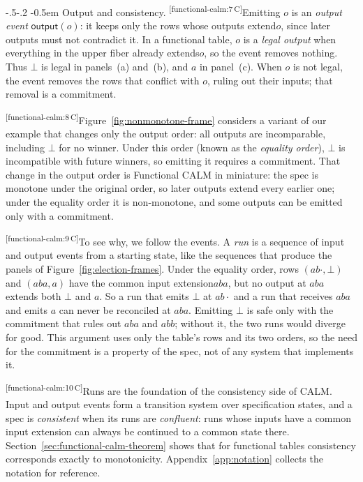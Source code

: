 \documentclass[sigconf]{cidr-2027}
\makeatletter
\theoremstyle{remark}
\renewcommand\paragraph{\@startsection{paragraph}{4}{\z@}%
  {-.5\baselineskip \@plus -2\p@ \@minus -.2\p@}%
  {-0.5em}%
  {\normalfont\bfseries}}
\newcommand{\commitment}{commitment\xspace}
\newcommand{\indesc}{input extension\xspace} %
\newcommand{\outrel}{extends\xspace}          %
\newcommand{\outrelbase}{extend\xspace}       %
\newcommand{\cxtag}[2]{\textsuperscript{\textsf{\tiny[#1\,#2]}}}
\makeatother
\begin{document}
\paragraph{Output and consistency.}
\color{black!45}\cxtag{functional-calm:7}{C}Emitting $o$ is an \emph{output event} $\mathsf{output}(o)$: it keeps only the
rows whose outputs \outrelbase $o$, since later outputs must not contradict it.
In a functional table, $o$ is a \emph{legal output} when everything in the
upper fiber already \outrel $o$, so the event removes nothing.  Thus
$\bot$ is legal in panels~(a) and~(b), and $a$ in panel~(c).  When $o$ is not
legal, the event removes the rows that conflict with $o$, ruling out their
inputs; that removal is a \commitment.\color{black}

\color{black!45}\cxtag{functional-calm:8}{C}Figure~\ref{fig:nonmonotone-frame} considers a variant of our example that
changes only the output order: all outputs are incomparable, including $\bot$
for no winner. Under this order (known as the \emph{equality order}), $\bot$ is
incompatible with future winners, so emitting it requires a \commitment.  That
change in the output order is Functional CALM in miniature: the spec is monotone
under the original order, so later outputs \outrelbase every earlier one; under
the equality order it is non-monotone, and some outputs can be emitted only with a \commitment.\color{black}

\color{black!45}\cxtag{functional-calm:9}{C}To see why, we follow the events.  A \emph{run} is a sequence of input and output
events from a starting state, like the sequences that produce the panels of
Figure~\ref{fig:election-frames}.  Under the equality order, rows
$(ab\cdot,\bot)$ and $(aba,a)$ have the common \indesc $aba$, but no output at
$aba$ \outrel both $\bot$ and $a$.  So a run that emits $\bot$ at $ab\cdot$ and
a run that receives $aba$ and emits $a$ can never be reconciled at $aba$.
Emitting $\bot$ is safe only with the \commitment that rules out $aba$ and
$abb$; without it, the two runs would diverge for good.  This argument uses only
the table's rows and its two orders, so the need for the \commitment is a
property of the spec, not of any system that implements it.\color{black}

\color{black!45}\cxtag{functional-calm:10}{C}Runs are the foundation of the consistency side of CALM.  Input and output
events form a transition system over specification states, and a spec is
\emph{consistent} when its runs are \emph{confluent}: runs whose inputs have a
common \indesc can always be continued to a common state there.
Section~\ref{sec:functional-calm-theorem} shows that for functional tables consistency corresponds exactly to
monotonicity.
Appendix~\ref{app:notation} collects the notation for reference.\color{black}
\end{document}
